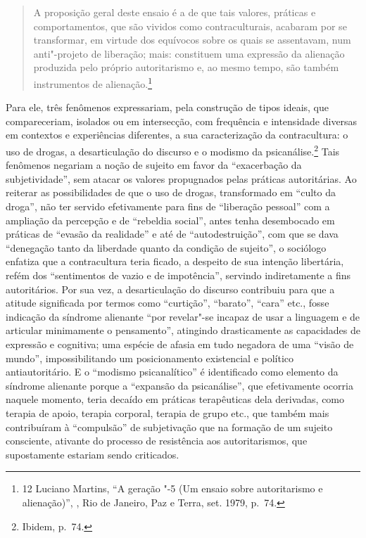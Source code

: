\begin{quote}
A proposição geral deste ensaio é a de que tais valores, práticas e
comportamentos, que são vividos como contraculturais, acabaram por se
transformar, em virtude dos equívocos sobre os quais se assentavam, num
anti"-projeto de liberação; mais: constituem uma expressão da alienação
produzida pelo próprio autoritarismo e, ao mesmo tempo, são também
instrumentos de alienação.\footnote{12 Luciano Martins, ``A geração "-5 (Um ensaio
  sobre autoritarismo e alienação)'', {},
  Rio de Janeiro, Paz e Terra, set. 1979, p.~74.}
\end{quote}

Para ele, três fenômenos expressariam, pela construção de tipos ideais,
que compareceriam, isolados ou em intersecção, com frequência e
intensidade diversas em contextos e experiências diferentes, a sua
caracterização da contracultura: o uso de drogas, a desarticulação do
discurso e o modismo da psicanálise.\footnote{Ibidem, p.~74.} Tais
fenômenos negariam a noção de sujeito em favor da ``exacerbação da
subjetividade'', sem atacar os valores propugnados pelas práticas
autoritárias. Ao reiterar as possibilidades de que o uso de drogas,
transformado em ``culto da droga'', não ter servido efetivamente para
fins de ``liberação pessoal'' com a ampliação da percepção e de
``rebeldia social'', antes tenha desembocado em práticas de ``evasão da
realidade'' e até de ``autodestruição'', com que se dava ``denegação
tanto da liberdade quanto da condição de sujeito'', o sociólogo enfatiza
que a contracultura teria ficado, a despeito de sua intenção libertária,
refém dos ``sentimentos de vazio e de impotência'', servindo
indiretamente a fins autoritários. Por sua vez, a desarticulação do
discurso contribuiu para que a atitude significada por termos como
``curtição'', ``barato'', ``cara'' etc., fosse indicação da síndrome
alienante ``por revelar"-se incapaz de usar a linguagem e de articular
minimamente o pensamento'', atingindo drasticamente as capacidades de
expressão e cognitiva; uma espécie de afasia em tudo negadora de uma
``visão de mundo'', impossibilitando um posicionamento existencial e
político antiautoritário. E o ``modismo psicanalítico'' é identificado
como elemento da síndrome alienante porque a ``expansão da
psicanálise'', que efetivamente ocorria naquele momento, teria decaído
em práticas terapêuticas dela derivadas, como terapia de apoio, terapia
corporal, terapia de grupo etc., que também mais contribuíram à
``compulsão'' de subjetivação que na formação de um sujeito consciente,
ativante do processo de resistência aos autoritarismos, que supostamente
estariam sendo criticados.


